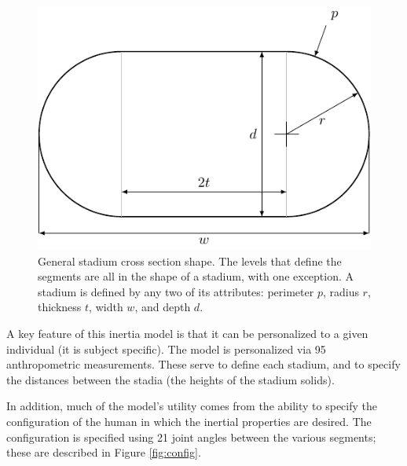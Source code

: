 \documentclass[10pt,a4paper,twocolumn]{article}
\begin{document}
\begin{figure}
  \begin{center}
    \includegraphics[width=\columnwidth]{figures/stadium.pdf}
  \end{center}
  \caption{
    General stadium cross section shape. The levels that define the segments
    are all in the shape of a stadium, with one exception. A stadium is defined
    by any two of its attributes: perimeter $p$, radius $r$, thickness $t$,
    width $w$, and depth $d$.
  }
  \label{fig:stadium}
\end{figure}

A key feature of this inertia model is that it can be personalized to a given
individual (it is subject specific). The model is personalized via 95
anthropometric measurements. These serve to define each stadium, and to specify
the distances between the stadia (the heights of the stadium solids).

In addition, much of the model's utility comes from the ability to specify the
configuration of the human in which the inertial properties are desired. The
configuration is specified using 21 joint angles between the various segments;
these are described in Figure \ref{fig:config}.
\end{document}
